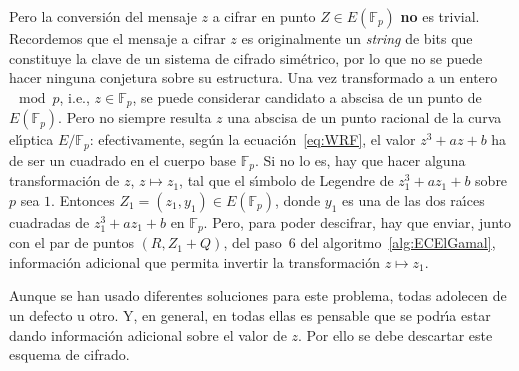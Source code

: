 \documentclass{cedi}%
\def\ce{curva{} el\'{\i}ptica}%
\newcommand{\Fp}{\ensuremath{\mathbb{F}_p}}%
\newcommand{\EFp}{\ensuremath{E(\mathbb{F}_p)}}%
\theoremstyle{plain}        			%
\theoremstyle{definition}   			%
\theoremstyle{saltolinea}   			%
\begin{document}
Pero la conversi\'on del mensaje $z$ a cifrar en punto $Z\in\EFp$ {\bf no} es trivial. Recordemos que el mensaje a cifrar $z$ es originalmente un \emph{string} de bits que constituye la clave de un sistema de cifrado sim\'etrico, por lo que no se puede hacer ninguna conjetura sobre su estructura. Una vez transformado a un entero $\mod p$, i.e., $z\in\Fp$, se puede considerar candidato a abscisa de un punto de $E(\Fp)$. Pero no siempre resulta $z$ una abscisa de un punto racional de la \ce{} $E/\Fp$: efectivamente, seg\'un la ecuaci\'on~\eqref{eq:WRF}, el valor $z^3+az+b$ ha de ser un cuadrado en el cuerpo base $\Fp$. Si no lo es, hay que hacer alguna transformaci\'on de $z$, $z\mapsto z_1$, tal que el s\'{\i}mbolo de Legendre de $z_1^3+az_1+b$ sobre $p$ sea $1$. Entonces $Z_1=(z_1,y_1)\in\EFp$, donde $y_1$ es una de las dos ra\'{\i}ces cuadradas de $z_1^3+az_1+b$ en $\Fp$. Pero, para poder descifrar, hay que enviar, junto con el par de puntos $(R,Z_1+Q)$, del paso~6 del algoritmo~\ref{alg:ECElGamal}, informaci\'on adicional que permita invertir la transformaci\'on $z\mapsto z_1$.

Aunque se han usado diferentes soluciones para este problema, todas adolecen de un defecto u otro. Y, en general, en todas ellas es pensable que se podr\'{\i}a estar dando informaci\'on adicional sobre el valor de $z$. Por ello se debe descartar este esquema de cifrado.



\end{document}
